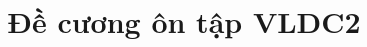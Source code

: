 \documentclass[letterpaper, 12pt]{article}
\newcommand{\1}{\mathds{1}}	%
\theoremstyle{definition}
\begin{document}

\title{Đề cương ôn tập VLDC2 \\[1em]
\normalsize }




\maketitle
\tableofcontents\label{sec:contents}







% 


% 







\end{document}
